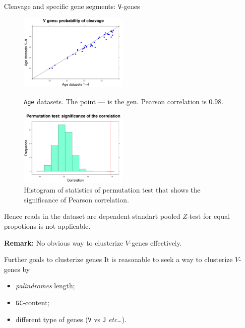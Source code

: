 \documentclass{beamer}\usepackage[]{graphicx}\usepackage[]{color}
\begin{document}
\begin{frame}{Cleavage and specific gene segments: \texttt{V}-genes}
 \begin{figure}[h]
  \begin{minipage}[h]{0.49\linewidth}
    \center\includegraphics[width=150pt]{Vgen_cleavage_age.pdf}
    \caption{\footnotesize{\texttt{Age} datasets. The point --- is the gen. Pearson correlation is $0.98$.}} 
  \end{minipage}
  \hfill
  \begin{minipage}[h]{0.49\linewidth}
   \includegraphics[width=150pt]{Vgen_cleavage_age_correlation.pdf}
    \caption{\footnotesize{Histogram of statistics of permutation test that shows the significance of Pearson correlation.}} 
  \end{minipage}
 \end{figure}
 \pause
 {\color{blue} Hence reads in the dataset are dependent standart pooled $Z$-test for equal propotions is not applicable.}
 \pause
 
 \textbf{Remark:} No obvious way to clusterize $V$-genes effectively.
\end{frame}

\begin{frame}{Further goals to clusterize genes}
  It is reasonable to seek a way to clusterize $V$-genes by
  \begin{itemize}
    \item \textit{palindromes} length;
    \item \texttt{GC}-content;
    \item different type of genes (\texttt{V} vs \texttt{J} \textit{etc\ldots}).
  \end{itemize}
\end{frame}
\end{document}
